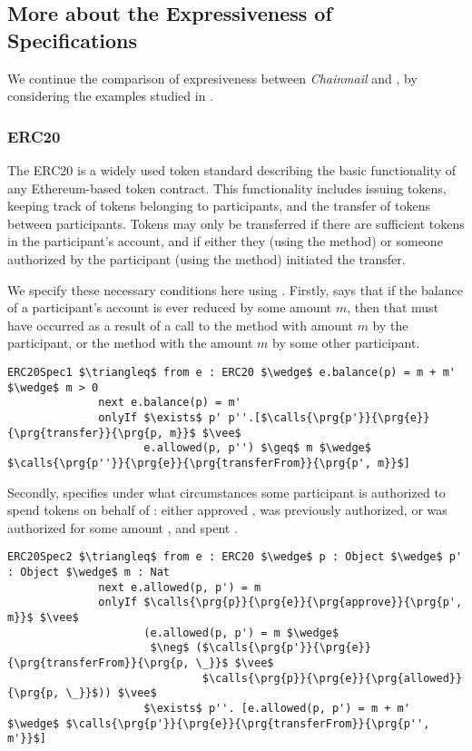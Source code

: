 \subsection{More about the Expressiveness of \Nec Specifications}
\label{s:expressiveness:appendix}

 We continue the comparison of expresiveness between \emph{Chainmail} and \Nec, by 
 considering the examples studied in \cite{FASE}.
 
\subsubsection{ERC20}
The ERC20 \cite{ERC20} is a widely used token standard describing the basic functionality of any Ethereum-based token 
contract. This functionality includes issuing tokens, keeping track of tokens belonging to participants, and the 
transfer of tokens between participants. Tokens may only be transferred if there are sufficient tokens in the 
participant's account, and if either they (using the  method) or someone authorized by the participant (using the  method) initiated the transfer. 

We specify these necessary conditions here using \Nec. Firstly,  
says that if the balance of a participant's account is ever reduced by some amount $m$, then
that must have occurred as a result of a call to the  method with amount $m$ by the participant,
or the  method with the amount $m$ by some other participant.
\begin{lstlisting}[language = Chainmail, mathescape=true, frame=lines]
ERC20Spec1 $\triangleq$ from e : ERC20 $\wedge$ e.balance(p) = m + m' $\wedge$ m > 0
              next e.balance(p) = m'
              onlyIf $\exists$ p' p''.[$\calls{\prg{p'}}{\prg{e}}{\prg{transfer}}{\prg{p, m}}$ $\vee$ 
                     e.allowed(p, p'') $\geq$ m $\wedge$ $\calls{\prg{p''}}{\prg{e}}{\prg{transferFrom}}{\prg{p', m}}$]
\end{lstlisting}
Secondly,  specifies under what circumstances some participant  is authorized to 
spend  tokens on behalf of : either  approved ,  was previously authorized,
or  was authorized for some amount , and spent .
\begin{lstlisting}[language = Chainmail, mathescape=true, frame=lines]
ERC20Spec2 $\triangleq$ from e : ERC20 $\wedge$ p : Object $\wedge$ p' : Object $\wedge$ m : Nat
              next e.allowed(p, p') = m
              onlyIf $\calls{\prg{p}}{\prg{e}}{\prg{approve}}{\prg{p', m}}$ $\vee$ 
                     (e.allowed(p, p') = m $\wedge$ 
                      $\neg$ ($\calls{\prg{p'}}{\prg{e}}{\prg{transferFrom}}{\prg{p, \_}}$ $\vee$ 
                              $\calls{\prg{p}}{\prg{e}}{\prg{allowed}}{\prg{p, \_}}$)) $\vee$
                     $\exists$ p''. [e.allowed(p, p') = m + m' $\wedge$ $\calls{\prg{p'}}{\prg{e}}{\prg{transferFrom}}{\prg{p'', m'}}$]
\end{lstlisting}

